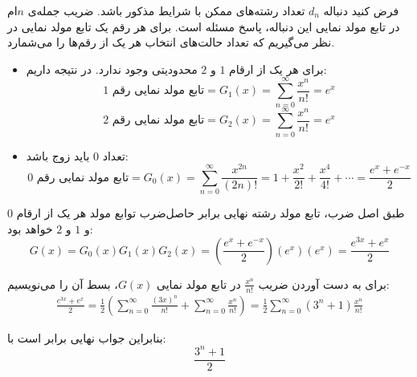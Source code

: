 \p
فرض کنید دنباله 
$d_n$ 
 تعداد رشته‌های ممکن با شرایط مذکور
باشد.
ضریب 
‌جمله‌ی 
$n$ام
در تابع مولد نمایی 
 این دنباله،
 پاسخ مسئله است.
برای هر رقم یک تابع مولد نمایی در نظر می‌گیریم که تعداد حالت‌های انتخاب‌ هر یک از رقم‌ها را می‌شمارد.
\begin{itemize}
\item
برای هر یک از ارقام
$1$
و 
$2$
 محدودیتی وجود ندارد. در نتیجه داریم:
$$\text{تابع مولد نمایی رقم 1} = G_1(x) = \sum\limits_{n=0}^{\infty}\frac{x^n}{n!} = e^x$$
$$\text{تابع مولد نمایی رقم 2} = G_2(x) = \sum\limits_{n=0}^{\infty}\frac{x^n}{n!} = e^x$$
\item
تعداد  
$0$
باید زوج باشد:
$$\text{تابع مولد نمایی رقم 0} = G_0(x) = \sum\limits_{n=0}^{\infty}\frac{x^{2n}}{(2n)!} = 1 + \frac{x^2}{2!} + \frac{x^4}{4!} + \cdots = \frac{e^x + e^{-x}}{2}$$
\end{itemize}
طبق اصل ضرب،
تابع مولد رشته نهایی برابر
 حاصل‌ضرب توابع مولد هر یک از ارقام 
 $0$
و
$1$
و 
$2$
 خواهد بود:
$$G(x) = G_0(x)G_1(x)G_2(x) = (\frac{e^x + e^{-x}}{2})(e^x)(e^{x}) = \frac{e^{3x} + e^x}{2}$$

برای به دست آوردن ضریب
$\frac{x^n}{n!}$
 در تابع مولد نمایی
 $G(x)$،
  بسط آن را می‌نویسیم: 
  \begin{align*}
    \frac{e^{3x} + e^x}{2} = \frac{1}{2}(\sum\limits_{n=0}^{\infty}\frac{(3x)^n}{n!} + \sum\limits_{n=0}^{\infty}\frac{x^n}{n!}) =\frac{1}{2}\sum\limits_{n=0}^{\infty}(3^n + 1)\frac{x^n}{n!}
  \end{align*}

بنابراین جواب نهایی برابر است با:
$$\frac{3^n+1}{2}$$

